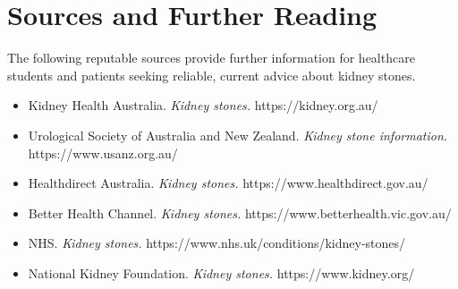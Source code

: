\section*{Sources and Further Reading}
The following reputable sources provide further information for healthcare students and patients seeking reliable, current advice about kidney stones.
\begin{itemize}
    \item Kidney Health Australia. \textit{Kidney stones.} https://kidney.org.au/
    \item Urological Society of Australia and New Zealand. \textit{Kidney stone information.} https://www.usanz.org.au/
    \item Healthdirect Australia. \textit{Kidney stones.} https://www.healthdirect.gov.au/
    \item Better Health Channel. \textit{Kidney stones.} https://www.betterhealth.vic.gov.au/
    \item NHS. \textit{Kidney stones.} https://www.nhs.uk/conditions/kidney-stones/
    \item National Kidney Foundation. \textit{Kidney stones.} https://www.kidney.org/
\end{itemize}
